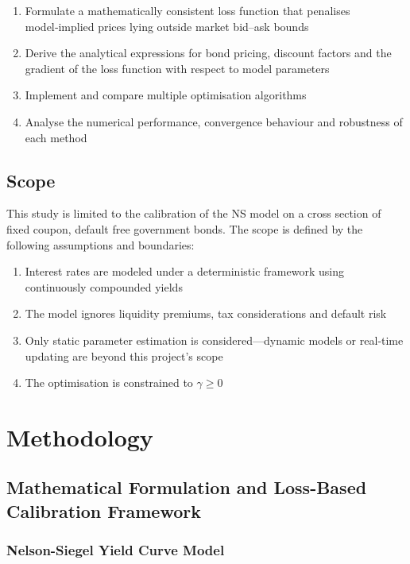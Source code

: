 \documentclass[12pt]{article}
\begin{document}
\begin{enumerate}
    \item Formulate a mathematically consistent loss function that penalises model‑implied prices lying outside market bid–ask bounds
    \item Derive the analytical expressions for bond pricing, discount factors and the gradient of the loss function with respect to model parameters
    \item Implement and compare multiple optimisation algorithms
    \item Analyse the numerical performance, convergence behaviour and robustness of each method
\end{enumerate}

\subsection{Scope}

This study is limited to the calibration of the NS model on a cross section of fixed coupon, default free government bonds. The scope is defined by the following assumptions and boundaries:

\begin{enumerate}
    \item Interest rates are modeled under a deterministic framework using continuously compounded yields
    \item The model ignores liquidity premiums, tax considerations and default risk
    \item Only static parameter estimation is considered—dynamic models or real‑time updating are beyond this project’s scope
    \item The optimisation is constrained to $\gamma\geq0$
\end{enumerate}

\section{Methodology}\label{sec:method}

\subsection{Mathematical Formulation and Loss-Based Calibration Framework}

\subsubsection{Nelson-Siegel Yield Curve Model}
\end{document}
